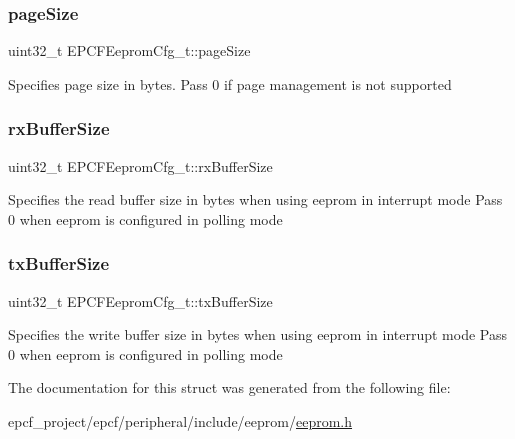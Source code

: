 \subsubsection{\texorpdfstring{page\+Size}{pageSize}}
{\footnotesize\ttfamily uint32\+\_\+t E\+P\+C\+F\+Eeprom\+Cfg\+\_\+t\+::page\+Size}

Specifies page size in bytes. Pass 0 if page management is not supported \mbox{\label{structEPCFEepromCfg__t_aec738dcc2cd2beb6e067d0500e183908}} 
\subsubsection{\texorpdfstring{rx\+Buffer\+Size}{rxBufferSize}}
{\footnotesize\ttfamily uint32\+\_\+t E\+P\+C\+F\+Eeprom\+Cfg\+\_\+t\+::rx\+Buffer\+Size}

Specifies the read buffer size in bytes when using eeprom in interrupt mode Pass 0 when eeprom is configured in polling mode \mbox{\label{structEPCFEepromCfg__t_a1e30b87160004affb4bb696a63c0c570}} 
\subsubsection{\texorpdfstring{tx\+Buffer\+Size}{txBufferSize}}
{\footnotesize\ttfamily uint32\+\_\+t E\+P\+C\+F\+Eeprom\+Cfg\+\_\+t\+::tx\+Buffer\+Size}

Specifies the write buffer size in bytes when using eeprom in interrupt mode Pass 0 when eeprom is configured in polling mode 

The documentation for this struct was generated from the following file\+:\begin{DoxyCompactItemize}
\item 
epcf\+\_\+project/epcf/peripheral/include/eeprom/\mbox{\hyperlink{eeprom_8h}{eeprom.\+h}}\end{DoxyCompactItemize}
